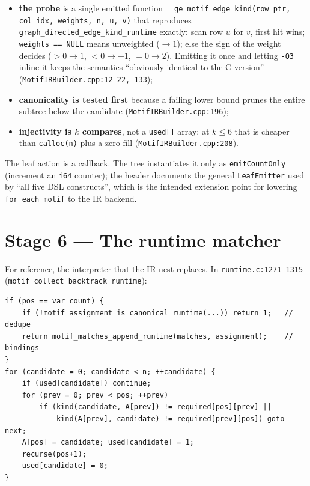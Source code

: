 \documentclass[11pt,a4paper]{article}
\newcommand{\code}[1]{\texttt{#1}}
\newcommand{\file}[1]{\texttt{#1}}
\begin{document}
\begin{itemize}
  \item \textbf{the probe} is a single emitted function
        \code{\_\_ge\_motif\_edge\_kind(row\_ptr, col\_idx, weights, n, u, v)}
        that reproduces \code{graph\_directed\_edge\_kind\_runtime} exactly:
        scan row $u$ for $v$, first hit wins; \code{weights == NULL} means
        unweighted ($\to 1$); else the sign of the weight decides ($>0 \to 1$,
        $<0 \to -1$, $=0 \to 2$). Emitting it once and letting \code{-O3} inline
        it keeps the semantics ``obviously identical to the C version''
        (\file{MotifIRBuilder.cpp:12--22, 133});
  \item \textbf{canonicality is tested first} because a failing lower bound
        prunes the entire subtree below the candidate
        (\file{MotifIRBuilder.cpp:196});
  \item \textbf{injectivity is $k$ compares}, not a \code{used[]} array: at
        $k\le 6$ that is cheaper than \code{calloc(n)} plus a zero fill
        (\file{MotifIRBuilder.cpp:208}).
\end{itemize}

The leaf action is a callback. The tree instantiates it only as
\code{emitCountOnly} (increment an \code{i64} counter); the header documents the
general \code{LeafEmitter} used by ``all five DSL constructs'', which is the
intended extension point for lowering \code{for each motif} to the IR backend.

\section{Stage 6 --- The runtime matcher}

For reference, the interpreter that the IR nest replaces. In
\file{runtime.c:1271--1315} (\code{motif\_collect\_backtrack\_runtime}):

\begin{lstlisting}[style=cpp]
if (pos == var_count) {
    if (!motif_assignment_is_canonical_runtime(...)) return 1;   // dedupe
    return motif_matches_append_runtime(matches, assignment);    // bindings
}
for (candidate = 0; candidate < n; ++candidate) {
    if (used[candidate]) continue;
    for (prev = 0; prev < pos; ++prev)
        if (kind(candidate, A[prev]) != required[pos][prev] ||
            kind(A[prev], candidate) != required[prev][pos]) goto next;
    A[pos] = candidate; used[candidate] = 1;
    recurse(pos+1);
    used[candidate] = 0;
}
\end{lstlisting}
\end{document}
